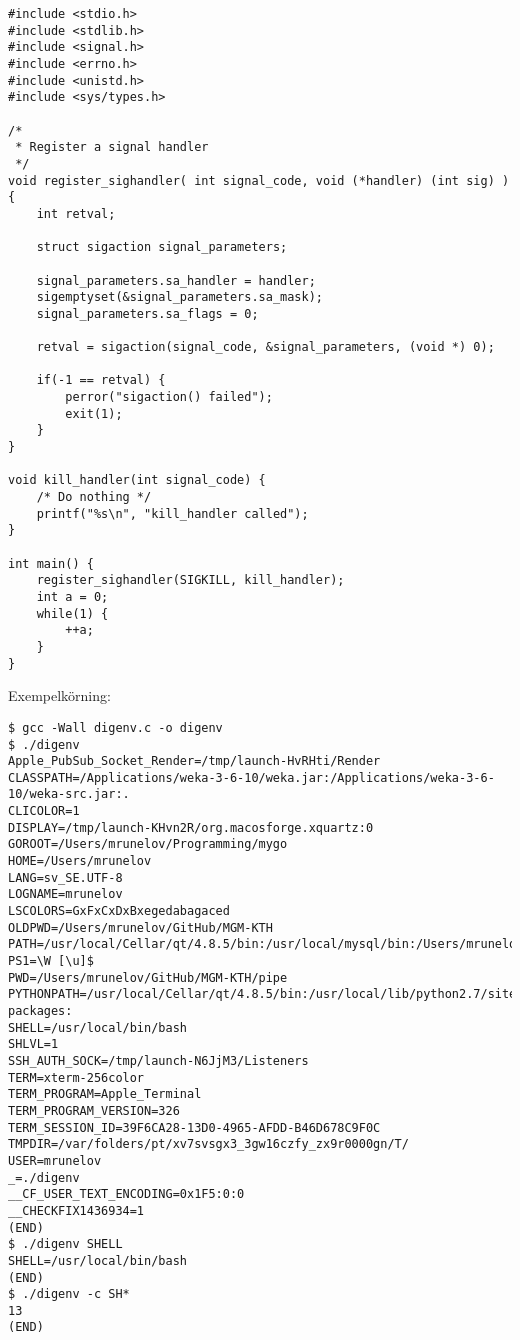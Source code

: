 \documentclass[paper=a4, fontsize=11pt]{scrartcl} %
\numberwithin{equation}{section} %
\numberwithin{figure}{section} %
\numberwithin{table}{section} %
\begin{document}
\begin{verbatim}
#include <stdio.h>
#include <stdlib.h>
#include <signal.h>
#include <errno.h>
#include <unistd.h>
#include <sys/types.h>

/*
 * Register a signal handler
 */
void register_sighandler( int signal_code, void (*handler) (int sig) )  {
    int retval;

    struct sigaction signal_parameters;

    signal_parameters.sa_handler = handler;
    sigemptyset(&signal_parameters.sa_mask);
    signal_parameters.sa_flags = 0;

    retval = sigaction(signal_code, &signal_parameters, (void *) 0);

    if(-1 == retval) {
        perror("sigaction() failed");
        exit(1);
    }
}

void kill_handler(int signal_code) {
    /* Do nothing */
    printf("%s\n", "kill_handler called");
}

int main() {
    register_sighandler(SIGKILL, kill_handler);
    int a = 0;
    while(1) {
        ++a;
    }
}
\end{verbatim}
\newpage


Exempelkörning:\\

\begin{verbatim}
$ gcc -Wall digenv.c -o digenv
$ ./digenv 
Apple_PubSub_Socket_Render=/tmp/launch-HvRHti/Render
CLASSPATH=/Applications/weka-3-6-10/weka.jar:/Applications/weka-3-6-10/weka-src.jar:.
CLICOLOR=1
DISPLAY=/tmp/launch-KHvn2R/org.macosforge.xquartz:0
GOROOT=/Users/mrunelov/Programming/mygo
HOME=/Users/mrunelov
LANG=sv_SE.UTF-8
LOGNAME=mrunelov
LSCOLORS=GxFxCxDxBxegedabagaced
OLDPWD=/Users/mrunelov/GitHub/MGM-KTH
PATH=/usr/local/Cellar/qt/4.8.5/bin:/usr/local/mysql/bin:/Users/mrunelov/scripts:/opt/local/bin:/opt/local/sbin:/usr/local/bin:/usr/local/google_appengine:/usr/local:/Library/Frameworks/Python.framework/Versions/2.7/bin:/usr/local/bin:/usr/bin:/bin:/usr/sbin:/sbin:/opt/X11/bin:/usr/local/go/bin:/usr/texbin:/Users/mrunelov/Programming/mygo/bin:/usr/local/go/bin
PS1=\W [\u]$ 
PWD=/Users/mrunelov/GitHub/MGM-KTH/pipe
PYTHONPATH=/usr/local/Cellar/qt/4.8.5/bin:/usr/local/lib/python2.7/site-packages:
SHELL=/usr/local/bin/bash
SHLVL=1
SSH_AUTH_SOCK=/tmp/launch-N6JjM3/Listeners
TERM=xterm-256color
TERM_PROGRAM=Apple_Terminal
TERM_PROGRAM_VERSION=326
TERM_SESSION_ID=39F6CA28-13D0-4965-AFDD-B46D678C9F0C
TMPDIR=/var/folders/pt/xv7svsgx3_3gw16czfy_zx9r0000gn/T/
USER=mrunelov
_=./digenv
__CF_USER_TEXT_ENCODING=0x1F5:0:0
__CHECKFIX1436934=1
(END) 
$ ./digenv SHELL
SHELL=/usr/local/bin/bash
(END) 
$ ./digenv -c SH*
13
(END)
\end{verbatim}

\end{document}
